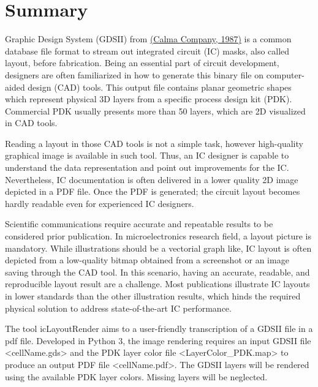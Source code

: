 \documentclass[10pt,a4paper,onecolumn]{article}
\begin{document}
\hypertarget{summary}{%
\section{Summary}\label{summary}}

Graphic Design System (GDSII) from \hyperlink{ref-Calma1987}{(Calma Company, 1987)} is a common
database file format to stream out integrated circuit (IC) masks, also
called layout, before fabrication. Being an essential part of circuit
development, designers are often familiarized in how to generate this
binary file on computer-aided design (CAD) tools. This output file
contains planar geometric shapes which represent physical 3D layers from
a specific process design kit (PDK). Commercial PDK usually presents
more than 50 layers, which are 2D visualized in CAD tools.

Reading a layout in those CAD tools is not a simple task, however
high-quality graphical image is available in such tool. Thus, an IC
designer is capable to understand the data representation and point out
improvements for the IC. Nevertheless, IC documentation is often
delivered in a lower quality 2D image depicted in a PDF file. Once the
PDF is generated; the circuit layout becomes hardly readable even for
experienced IC designers.

Scientific communications require accurate and repeatable results to be
considered prior publication. In microelectronics research field, a
layout picture is mandatory. While illustrations should be a vectorial
graph like, IC layout is often depicted from a low-quality bitmap
obtained from a screenshot or an image saving through the CAD tool. In
this scenario, having an accurate, readable, and reproducible layout
result are a challenge. Most publications illustrate IC layouts in lower
standards than the other illustration results, which hinds the required
physical solution to address state-of-the-art IC performance.

The tool icLayoutRender aims to a user-friendly transcription of a GDSII
file in a pdf file. Developed in Python 3, the image rendering requires
an input GDSII file \textless cellName.gds\textgreater{} and the PDK
layer color file \textless LayerColor\_PDK.map\textgreater{} to produce
an output PDF file \textless cellName.pdf\textgreater. The GDSII layers
will be rendered using the available PDK layer colors. Missing layers
will be neglected.
\end{document}
